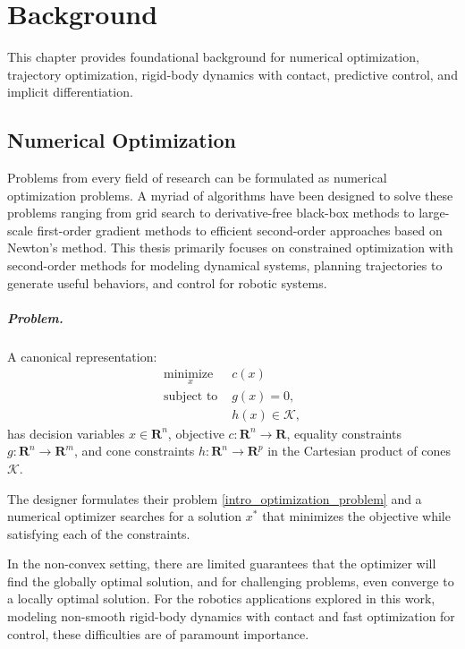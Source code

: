 \chapter{Background}
This chapter provides foundational background for numerical optimization, trajectory optimization, rigid-body dynamics with contact, predictive control, and implicit differentiation.

\section{Numerical Optimization}
Problems from every field of research can be formulated as numerical optimization problems. A myriad of algorithms have been designed to solve these problems ranging from grid search to derivative-free black-box methods to large-scale first-order gradient methods to efficient second-order approaches based on Newton's method. This thesis primarily focuses on constrained optimization with second-order methods for modeling dynamical systems, planning trajectories to generate useful behaviors, and control for robotic systems.

\paragraph{Problem.}
A canonical representation:
\begin{equation}
	\begin{array}{ll}
		\underset{x}{\mbox{minimize }}  & c(x) \\
		\mbox{subject to } & g(x) = 0, \\
		& h(x) \in \mathcal{K},
	\end{array} \label{intro_optimization_problem}
\end{equation}
has decision variables $x \in \mathbf{R}^n$, objective $c : \mathbf{R}^n \rightarrow \mathbf{R}$, equality constraints $g : \mathbf{R}^n \rightarrow \mathbf{R}^m$, and cone constraints $h : \mathbf{R}^n \rightarrow \mathbf{R}^p$ in the Cartesian product of cones $\mathcal{K}$. 

The designer formulates their problem \eqref{intro_optimization_problem} and a numerical optimizer searches for a solution $x^*$ that minimizes the objective while satisfying each of the constraints.

In the non-convex setting, there are limited guarantees that the optimizer will find the globally optimal solution, and for challenging problems, even converge to a locally optimal solution. For the robotics applications explored in this work, modeling non-smooth rigid-body dynamics with contact and fast optimization for control, these difficulties are of paramount importance.

